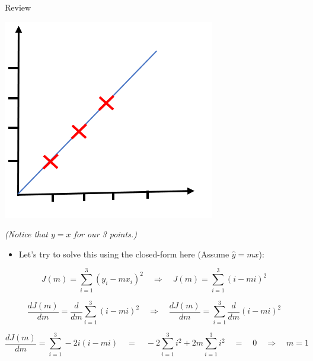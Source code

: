 \begin{frame}[allowframebreaks]{Review}

    \begin{center}
        \includegraphics[width=0.7\linewidth]{images/linear-regression/linear-regression-10.png}

        \tiny \textit{(Notice that $y = x$ for our 3 points.)}
    \end{center}

\framebreak

    \begin{itemize}
        \item Let’s try to solve this using the closed-form here (Assume $\hat{y} = mx$):
    \end{itemize}

    \[
    J(m) = \sum_{i=1}^3 (y_i - mx_i)^2 
    \quad \Rightarrow \quad
    J(m) = \sum_{i=1}^3 (i - mi)^2
    \]

\framebreak

    \[
    \frac{dJ(m)}{dm} = \frac{d}{dm} \sum_{i=1}^3 (i - mi)^2
    \quad \Rightarrow \quad
    \frac{dJ(m)}{dm} = \sum_{i=1}^3 \frac{d}{dm}(i - mi)^2
    \]

\framebreak

    \[
    \frac{dJ(m)}{dm} = \sum_{i=1}^3 -2i(i - mi)
    \quad = \quad
    -2 \sum_{i=1}^3 i^2 + 2m \sum_{i=1}^3 i^2 
    \quad = \quad 0 
    \quad \Rightarrow \quad m = 1
    \]

\end{frame}


